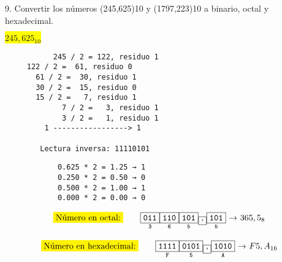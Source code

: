 \documentclass[a4paper,12pt]{article}
\begin{document}
	9. Convertir los números (245,625)10 y (1797,223)10 a binario, octal y hexadecimal.
	
	\begin{center}
		\colorbox{yellow}{{$245,625_{10}$}} \\ \vspace{0.3cm}
	\end{center}	
	\vspace{-1em}
	\begin{minipage}[t]{0.40\textwidth}
		\hspace{2,5cm}
		
\begin{Verbatim}
           245 / 2 = 122, residuo 1
  	 122 / 2 =  61, residuo 0
 	   61 / 2 =  30, residuo 1
 	   30 / 2 =  15, residuo 0
 	   15 / 2 =   7, residuo 1
             7 / 2 =   3, residuo 1
             3 / 2 =   1, residuo 1
	     1 -----------------> 1
	     
	    Lectura inversa: 11110101
		\end{Verbatim}
	
	\end{minipage}
	\hfill
	\begin{minipage}[t]{0.625\textwidth}
		\hspace{2cm}
		
		\begin{Verbatim}
			0.625 * 2 = 1.25 → 1 
			0.250 * 2 = 0.50 → 0 
			0.500 * 2 = 1.00 → 1 
			0.000 * 2 = 0.00 → 0 
		\end{Verbatim}
	\end{minipage}
	\begin{center}
		\hspace{2cm}
	\end{center}
	
	\[
	\mathtt{
		\colorbox{yellow}{Número en octal:} \qquad
		\underset{3}{\boxed{\mathtt{011}}}
		\underset{6}{\boxed{\mathtt{110}}}
		\underset{5}{\boxed{\mathtt{101}}}
		\underset{}{\boxed{\mathtt{,}}}
		\underset{5}{\boxed{\mathtt{101}}}
		\text{ → $365,5_8$}
	}	
	\]
	
	\[
	\mathtt{
		\colorbox{yellow}{Número en hexadecimal:} \qquad
		\underset{F}{\boxed{\mathtt{1111}}}
		\underset{5}{\boxed{\mathtt{0101}}}
		\underset{}{\boxed{\mathtt{,}}}
		\underset{A}{\boxed{\mathtt{1010}}}
		\text{ → $F5,A_{16}$}
	}	
	\]
	
\end{document}
